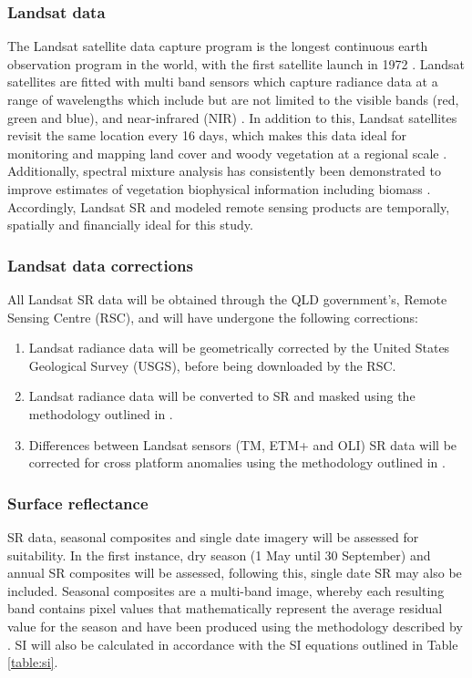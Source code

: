 \subsubsection{Landsat data}
The Landsat satellite data capture program is the longest continuous earth observation program in the world, with the first satellite launch in 1972 \citep{stabenetal2018}. Landsat satellites are fitted with multi band sensors which capture radiance data at a range of wavelengths which include but are not limited to the visible bands (red, green and blue), and near-infrared (NIR) \citep{Storey2014}. In addition to this, Landsat satellites revisit the same location every 16 days, which makes this data ideal for monitoring and mapping land cover and woody vegetation at a regional scale \citep{slats2015_16, Armstrongetal.2009, stabenetal2018}. Additionally, spectral mixture analysis has consistently been demonstrated to improve estimates of vegetation biophysical information including biomass \citep{peddleetal2001}. Accordingly, Landsat SR and modeled remote sensing products are temporally, spatially and financially ideal for this study.

\subsubsection{Landsat data corrections}
All Landsat SR data will be obtained through the QLD government's, Remote Sensing Centre (RSC), and will have undergone the following corrections:
\begin{enumerate}
    \item Landsat radiance data will be geometrically corrected by the United States Geological Survey (USGS), before being downloaded by the RSC.
    \item Landsat radiance data will be converted to SR and masked using the methodology outlined in \cite{floodetal2013}.
    \item Differences between Landsat sensors (TM, ETM+ and OLI) SR data will be corrected for cross platform anomalies using the methodology outlined in \cite{flood2014}.
\end{enumerate}

\subsubsection{Surface reflectance}
SR data, seasonal composites and single date imagery will be assessed for suitability. In the first instance, dry season (1 May until 30 September) and annual SR composites will be assessed, following this, single date SR may also be included. Seasonal composites are a multi-band image, whereby each resulting band contains pixel values that mathematically represent the average residual value for the season and have been produced using the methodology described by \cite{flood2013}. SI will also be calculated in accordance with the SI equations outlined in Table \ref{table:si}.

